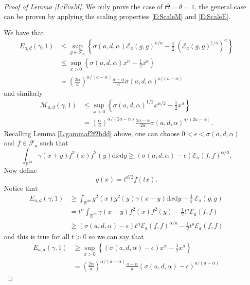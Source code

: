 \documentclass[12pt]{report}
\theoremstyle{plain}
\theoremstyle{definition}
\numberwithin{equation}{section}
\newcommand{\R}{\mathbb{R}}
\newcommand{\ud}{\ensuremath{ \mathrm{d} }}
\begin{document}
\begin{proof}[Proof of Lemma \ref{L:EvsM}]
	We only prove the case of $\Theta=\theta=1$, the general case can be proven by applying the scaling properties \eqref{E:ScaleM} and \eqref{E:ScaleE}.
	
	We have that
	\begin{align}
	E_{a,d}(\gamma,1)
	& \le \sup_{g\in \mathcal{F}_a} \left\{ \sigma(a,d,\alpha) \mathcal{E}_a(g,g)^{\alpha/a} - \frac{1}{2}\: (\mathcal{E}_a(g,g)^{1/a})^a \right\} \nonumber \\
	& \le \sup_{x>0} \left\{ \sigma(a,d,\alpha) x^\alpha - \frac{1}{2}x^a \right\} \nonumber                                                                 \\
	& = \left(\frac{2\alpha}{a}\right)^{\alpha/(a-\alpha)}\frac{a-\alpha}{a}\sigma(a,d,\alpha)^{a/(a-\alpha)}
	\label{E:Eupperbound}
	\end{align}
	and similarly
	\begin{align}
	\mathcal{M}_{a,d}(\gamma,1)
	& \le \sup_{x > 0} \left\{ \sigma(a,d,\alpha)^{1/2} x^{\alpha/2} - \frac{1}{2} x^{a} \right\} \nonumber \\
	& = \left( \frac{\alpha}{a}\right)^{\alpha/(2a-\alpha)} \frac{2a-\alpha}{2a}\sigma(a,d,\alpha)^{a/(2a-\alpha)}.
	\label{E:Mupperbound}
	\end{align}
	Recalling Lemma \ref{L:gammaf2f2bdd} above, one can choose $0 < \epsilon < \sigma(a,d,\alpha)$ and $f\in
	\mathcal{F}_a$ such that
	\[
	\int_{\R^{2d}} \gamma(x+y)f^2(x)f^2(y) \ud x \ud y \ge (\sigma(a,d,\alpha)-\epsilon) \mathcal{E}_a(f,f)^{\alpha/a}.
	\]
	Now define
	\[
	g(x) = t^{d/2}f(tx).
	\]
	Notice that
	\begin{align*}
	E_{a,d}(\gamma,1)
	& \ge \int_{\R^{2d}} g^2(x)g^2(y) \gamma(x-y)\ud x\ud y - \frac{1}{2}\: \mathcal{E}_a(g,g)    \\
	& = t^\alpha \int_{\R^{2d}} \gamma(x-y) f^2(x)f^2(y) -     \frac{1}{2} t^a \mathcal{E}_a(f,f) \\
	& \ge (\sigma(a,d,\alpha)-\epsilon) t^{\alpha} \mathcal{E}_a(f,f)^{\alpha/a} - \frac{1}{2} t^a \mathcal{E}_a(f,f)
	\end{align*}
	and this is true for all $t>0$ so we can say that
	\begin{align*}
	E_{a,d}(\gamma,1)
	& \ge \sup_{x>0} \left\{ (\sigma(a,d,\alpha)-\epsilon) x^\alpha - \frac{1}{2} x^a \right\} \nonumber \\
	& = \left(\frac{2\alpha}{a}\right)^{\alpha/(a-\alpha)}\frac{a-\alpha}{a}(\sigma(a,d,\alpha)-\epsilon)^{a/(a-\alpha)}
	\end{align*}

\end{proof}
\end{document}
